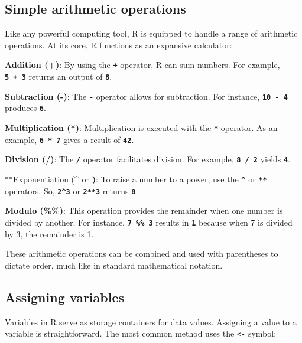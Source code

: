 \documentclass[
  b5paper]{book}
\begin{document}
\hypertarget{simple-arithmetic-operations}{%
\subsection*{Simple arithmetic operations}\label{simple-arithmetic-operations}}

Like any powerful computing tool, R is equipped to handle a range of arithmetic operations. At its core, R functions as an expansive calculator:

\textbf{Addition (+)}: By using the \textbf{\texttt{+}} operator, R can sum numbers. For example, \textbf{\texttt{5\ +\ 3}} returns an output of \textbf{\texttt{8}}.

\textbf{Subtraction (-)}: The \textbf{\texttt{-}} operator allows for subtraction. For instance, \textbf{\texttt{10\ -\ 4}} produces \textbf{\texttt{6}}.

\textbf{Multiplication (*)}: Multiplication is executed with the \textbf{\texttt{*}} operator. As an example, \textbf{\texttt{6\ *\ 7}} gives a result of \textbf{\texttt{42}}.

\textbf{Division (/)}: The \textbf{\texttt{/}} operator facilitates division. For example, \textbf{\texttt{8\ /\ 2}} yields \textbf{\texttt{4}}.

**Exponentiation (\^{} or \textbf{)}: To raise a number to a power, use the \textbf{\texttt{\^{}}} or \textbf{\texttt{**}} operators. So, \textbf{\texttt{2\^{}3}} or \textbf{\texttt{2**3}} returns \textbf{\texttt{8}}.

\textbf{Modulo (\%\%)}: This operation provides the remainder when one number is divided by another. For instance, \textbf{\texttt{7\ \%\%\ 3}} results in \textbf{\texttt{1}} because when 7 is divided by 3, the remainder is 1.

These arithmetic operations can be combined and used with parentheses to dictate order, much like in standard mathematical notation.

\hypertarget{assigning-variables}{%
\subsection*{Assigning variables}\label{assigning-variables}}

Variables in R serve as storage containers for data values. Assigning a value to a variable is straightforward. The most common method uses the \texttt{\textless{}-} symbol:
\end{document}
